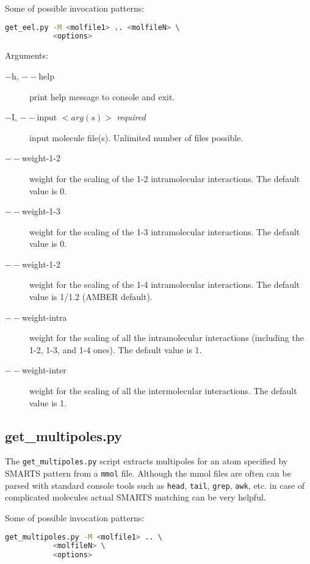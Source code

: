 \documentclass[10pt,a4paper]{article}
\begin{document}
Some of possible invocation patterns:
\begin{lstlisting}[language=bash]
get_eel.py -M <molfile1> .. <molfileN> \
           <options>
\end{lstlisting}

Arguments:
\begin{description}
\item[$-$h, $--$help] print help message to console and exit.
\item[$-$I, $--$input $<arg(s)>$ \textit{required}] input molecule file(s). 
Unlimited number of files possible.
\item[$--$weight-1-2] weight for the scaling of the 1-2 intramolecular interactions. 
The default value is 0.
\item[$--$weight-1-3] weight for the scaling of the 1-3 intramolecular interactions. 
The default value is 0.
\item[$--$weight-1-2] weight for the scaling of the 1-4 intramolecular interactions. 
The default value is 1/1.2 (AMBER default).
\item[$--$weight-intra] weight for the scaling of all the intramolecular interactions
(including the 1-2, 1-3, and 1-4 ones). The default value is 1.
\item[$--$weight-inter] weight for the scaling of all the intermolecular interactions. 
The default value is 1.
\end{description}

\subsection{get\_multipoles.py}
The \lstinline{get_multipoles.py} script extracts multipoles for an atom specified by 
SMARTS pattern from a \lstinline{mmol} file. Although the mmol files are often can be 
parsed with standard console tools such as \lstinline{head}, \lstinline{tail}, 
\lstinline{grep}, \lstinline{awk}, etc. in case of complicated molecules actual SMARTS
matching can be very helpful.

Some of possible invocation patterns:
\begin{lstlisting}[language=bash]
get_multipoles.py -M <molfile1> .. \
           <molfileN> \
           <options>
\end{lstlisting}
\end{document}
